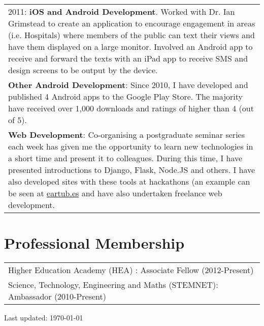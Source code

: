 \documentclass[11pt,fullpage]{article}
\begin{document}
\begin{tabular}{>{\everypar{\hangindent0.5in}}p{6in}}
	2011: \textbf{iOS and Android Development}. Worked with Dr. Ian Grimstead to create an application to encourage engagement in areas (i.e. Hospitals) where members of the public 		can text their views and have them displayed on a large monitor. Involved an Android app to receive and forward the texts with an iPad app to receive SMS and design screens to be 			output by the device. \\
	\textbf{Other Android Development}: Since 2010, I have developed and published 4 Android apps to the Google Play Store. The majority have received over 1,000 downloads and ratings of higher than 	4 (out of 5). \\
	\textbf{Web Development}: Co-organising a postgraduate seminar series each week has given me the opportunity to learn new technologies in a short time and present it to colleagues. During this 	time, I have presented introductions to Django, Flask, Node.JS and others. I have also developed sites with these tools at hackathons (an example can be seen at 						    \href{http://eartub.es}{eartub.es} and have also undertaken freelance web development.
\end{tabular}

\section*{Professional Membership}

\begin{tabular}{>{\everypar{\hangindent0.5in}}p{6in}}
	Higher Education Academy (HEA) : Associate Fellow (2012-Present) \\
	Science, Technology, Engineering and Maths (STEMNET): Ambassador (2010-Present)
\end{tabular}
\bigskip
\begin{center}
  \begin{footnotesize}
    Last updated: \today
  \end{footnotesize}
\end{center}

\end{document}
